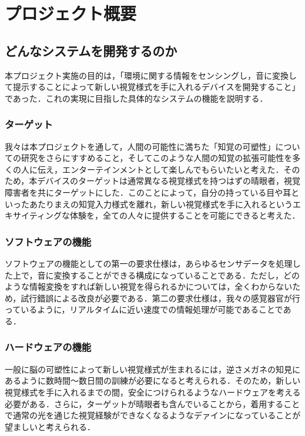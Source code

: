 \section{プロジェクト概要}
\subsection{どんなシステムを開発するのか}
本プロジェクト実施の目的は，「環境に関する情報をセンシングし，音に変換して提示することによって新しい視覚様式を手に入れるデバイスを開発すること」であった．これの実現に目指した具体的なシステムの機能を説明する．
\subsubsection{ターゲット}
我々は本プロジェクトを通して，人間の可能性に満ちた「知覚の可塑性」についての研究をさらにすすめること，そしてこのような人間の知覚の拡張可能性を多くの人に伝え，エンターテインメントとして楽しんでもらいたいと考えた．そのため，本デバイスのターゲットは通常異なる視覚様式を持つはずの晴眼者，視覚障害者を共にターゲットにした．このことによって，自分の持っている目や耳といったあたりまえの知覚入力様式を離れ，新しい視覚様式を手に入れるというエキサイティングな体験を，全ての人々に提供することを可能にできると考えた．
\subsubsection{ソフトウェアの機能}
ソフトウェアの機能としての第一の要求仕様は，あらゆるセンサデータを処理した上で，音に変換することができる構成になっていることである．ただし，どのような情報変換をすれば新しい視覚を得られるかについては，全くわからないため，試行錯誤による改良が必要である．第二の要求仕様は，我々の感覚器官が行っているように，リアルタイムに近い速度での情報処理が可能であることである．
\subsubsection{ハードウェアの機能}
一般に脳の可塑性によって新しい視覚様式が生まれるには，逆さメガネの知見にあるように数時間〜数日間の訓練が必要になると考えられる．そのため，新しい視覚様式を手に入れるまでの間，安全につけられるようなハードウェアを考える必要がある．さらに，ターゲットが晴眼者も含んでいることから，着用することで通常の光を通じた視覚経験ができなくなるようなデァインになっていることが望ましいと考えられる．
